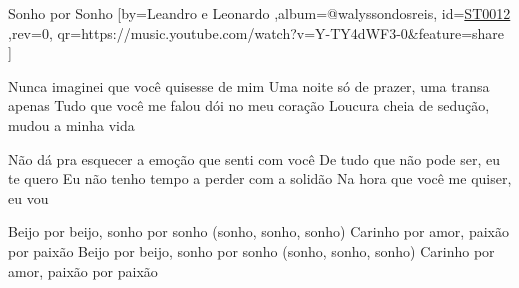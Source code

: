 \beginsong
{Sonho por Sonho %
}[by={Leandro e Leonardo %
},album={@walyssondosreis},
id={\href{https://music.youtube.com/watch?v=Y-TY4dWF3-0&feature=share %
}{ST0012 %
}},rev={0}, %
qr={https://music.youtube.com/watch?v=Y-TY4dWF3-0&feature=share %
}]

\beginverse
Nunca imaginei que você quisesse de mim
Uma noite só de prazer, uma transa apenas
Tudo que você me falou dói no meu coração
Loucura cheia de sedução, mudou a minha vida
\endverse

\beginverse
Não dá pra esquecer a emoção que senti com você
De tudo que não pode ser, eu te quero
Eu não tenho tempo a perder com a solidão
Na hora que você me quiser, eu vou
\endverse

\beginchorus
Beijo por beijo, sonho por sonho (sonho, sonho, sonho)
Carinho por amor, paixão por paixão
Beijo por beijo, sonho por sonho (sonho, sonho, sonho)
Carinho por amor, paixão por paixão
\endchorus

